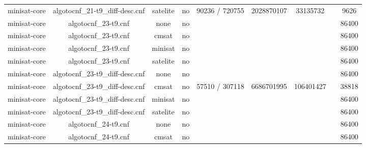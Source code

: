 \begin{appendices}
\begin{table}[p]
\begin{center}
\begin{tabular}{l|cccccccc}
  minisat-core                   & algotocnf\_21-t9\_diff-desc.cnf & satelite   & no    & 90236 / 720755 & 2028870107 & 33135732  &            & 9626 \\ %
  minisat-core                   & algotocnf\_23-t9.cnf           & none       & no    &            &           &           &            & 86400 \\ %
  minisat-core                   & algotocnf\_23-t9.cnf           & cmsat      & no    &            &           &           &            & 86400 \\ %
  minisat-core                   & algotocnf\_23-t9.cnf           & minisat    & no    &            &           &           &            & 86400 \\ %
  minisat-core                   & algotocnf\_23-t9.cnf           & satelite   & no    &            &           &           &            & 86400 \\ %
  minisat-core                   & algotocnf\_23-t9\_diff-desc.cnf & none       & no    &            &           &           &            & 86400 \\ %
  minisat-core                   & algotocnf\_23-t9\_diff-desc.cnf & cmsat      & no    & 57510 / 307118 & 6686701995 & 106401427 &            & 38818 \\ %
  minisat-core                   & algotocnf\_23-t9\_diff-desc.cnf & minisat    & no    &            &           &           &            & 86400 \\ %
  minisat-core                   & algotocnf\_23-t9\_diff-desc.cnf & satelite   & no    &            &           &           &            & 86400 \\ %
  minisat-core                   & algotocnf\_24-t9.cnf           & none       & no    &            &           &           &            & 86400 \\ %
  minisat-core                   & algotocnf\_24-t9.cnf           & cmsat      & no    &            &           &           &            & 86400 \\ %

\end{tabular}
\end{center}
\end{table}
\end{appendices}
